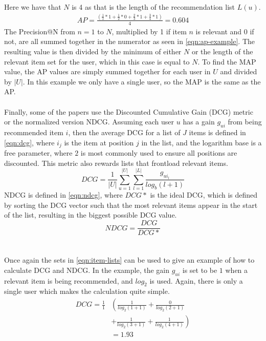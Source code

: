Here we have that $N$ is 4 as that is the length of the recommendation list $L(u)$.
\begin{align}
    AP = \frac{(\frac{1}{1}*1+\frac{1}{2}*0+\frac{2}{3}*1+\frac{3}{4}*1)}{4} = 0.604 \label{eqn:ap-example}
\end{align}
The Precision@N from $n=1$ to $N$, multiplied by 1 if item $n$ is relevant and 0 if not, are all summed together in the numerator as seen in \autoref{eqn:ap-example}.
The resulting value is then divided by the minimum of either $N$ or the length of the relevant item set for the user, which in this case is equal to $N$.
To find the MAP value, the AP values are simply summed together for each user in $U$ and divided by $|U|$.
In this example we only have a single user, so the MAP is the same as the AP.
\\\\
Finally, some of the papers use the Discounted Cumulative Gain (DCG) metric or the normalized version NDCG.
Assuming each user $u$ has a gain $g_{ui}$ from being recommended item $i$, then the average DCG for a list of $J$ items is defined in \autoref{eqn:dcg}, where $i_j$ is the item at position $j$ in the list, and the logarithm base is a free parameter, where $2$ is most commonly used to ensure all positions are discounted.
This metric also rewards lists that frontload relevant items.
\begin{equation}
    \label{eqn:dcg}
    DCG = \frac{1}{|U|} \sum\limits_{u=1}^{|U|} \sum\limits_{l = 1}^{|L|} \frac{g_{ui_l}}{log_b (l+1)}
\end{equation}
NDCG is defined in \autoref{eqn:ndcg}, where $DCG*$ is the ideal DCG, which is defined by sorting the DCG vector such that the most relevant items appear in the start of the list\cite{dcgpaper}, resulting in the biggest possible DCG value.
\begin{equation}
    \label{eqn:ndcg}
    NDCG = \frac{DCG}{DCG*}
\end{equation}
\\\\
Once again the sets in \autoref{eqn:item-lists} can be used to give an example of how to calculate DCG and NDCG.
In the example, the gain $g_{ui}$ is set to be $1$ when a relevant item is being recommended, and $log_2$ is used.
Again, there is only a single user which makes the calculation quite simple.
\begin{align*}
    DCG = \frac{1}{1} &\left (\frac{1}{log_2 (1+1)} + \frac{0}{log_2 (2+1)} \right.\\
    & \left.+ \frac{1}{log_2 (3+1)} + \frac{1}{log_2 (4+1)}\right) \\
    & = 1.93
\end{align*}
